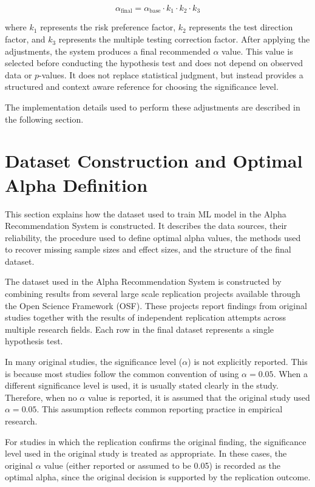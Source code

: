 \begin{equation}
	\alpha_{\text{final}} 
	= 
	\alpha_{\text{base}} 
	\cdot k_1 
	\cdot k_2 
	\cdot k_3
\end{equation}

where $k_1$ represents the risk preference factor, 
$k_2$ represents the test direction factor, 
and $k_3$ represents the multiple testing correction factor.
After applying the adjustments, the system produces a final recommended $\alpha$ value. This value is selected before conducting the hypothesis test and does not depend on observed data or $p$-values. It does not replace statistical judgment, but instead provides a structured and context aware reference for choosing the significance level.

The implementation details used to perform these adjustments are described in the following section.

\section{Dataset Construction and Optimal Alpha Definition}
\label{sec:Dataset}
This section explains how the dataset used to train ML model in the Alpha Recommendation System is constructed. It describes the data sources, their reliability, the procedure used to define optimal alpha values, the methods used to recover missing sample sizes and effect sizes, and the structure of the final dataset.

The dataset used in the Alpha Recommendation System is constructed by combining results from several large scale replication projects available through the Open Science Framework (OSF). These projects report findings from original studies together with the results of independent replication attempts across multiple research fields\cite{FosterDeardorff2017}. Each row in the final dataset represents a single hypothesis test.

In many original studies, the significance level ($\alpha$) is not explicitly reported. This is because most studies follow the common convention of using $\alpha = 0.05$\cite{Kim2015}. When a different significance level is used, it is usually stated clearly in the study. Therefore, when no $\alpha$ value is reported, it is assumed that the original study used $\alpha = 0.05$. This assumption reflects common reporting practice in empirical research.

For studies in which the replication confirms the original finding, the significance level used in the original study is treated as appropriate. In these cases, the original $\alpha$ value (either reported or assumed to be 0.05) is recorded as the optimal alpha, since the original decision is supported by the replication outcome.

